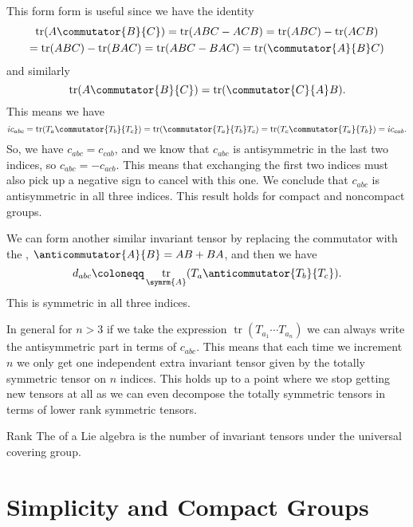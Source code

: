 \documentclass[fleqn]{NotesClass}
\DeclareMathOperator{\tr}{tr}
\begin{document}
    This form form is useful since we have the identity
    \begin{multline}
        \tr(A \commutator{B}{C}) = \tr(ABC - ACB) = \tr(ABC) - \tr(ACB)\\
        = \tr(ABC) - \tr(BAC) = \tr(ABC - BAC) = \tr(\commutator{A}{B}C)
    \end{multline}
    and similarly
    \begin{equation}
        \tr(A\commutator{B}{C}) = \tr(\commutator{C}{A}B).
    \end{equation}
    This means we have
    \begin{equation}
        ic_{abc} = \tr(T_a\commutator{T_b}{T_c}) = \tr(\commutator{T_a}{T_b}T_c) = \tr(T_c\commutator{T_a}{T_b}) = ic_{cab}.
    \end{equation}
    So, we have \(c_{abc} = c_{cab}\), and we know that \(c_{abc}\) is antisymmetric in the last two indices, so \(c_{abc} = -c_{acb}\).
    This means that exchanging the first two indices must also pick up a negative sign to cancel with this one.
    We conclude that \(c_{abc}\) is antisymmetric in all three indices.
    This result holds for compact and noncompact groups.
    
    We can form another similar invariant tensor by replacing the commutator with the , \(\anticommutator{A}{B} = AB + BA\), and then we have
    \begin{equation}
        d_{abc} \coloneqq \tr_{\symrm{A}}(T_a\anticommutator{T_b}{T_c}).
    \end{equation}
    This is symmetric in all three indices.
    
    In general for \(n > 3\) if we take the expression \(\tr(T_{a_1} \dotsm T_{a_n})\) we can always write the antisymmetric part in terms of \(c_{abc}\).
    This means that each time we increment \(n\) we only get one independent extra invariant tensor given by the totally symmetric tensor on \(n\) indices.
    This holds up to a point where we stop getting new tensors at all as we can even decompose the totally symmetric tensors in terms of lower rank symmetric tensors.
    
    \begin{dfn}{Rank}{}
        The  of a Lie algebra is the number of invariant tensors under the universal covering group.
    \end{dfn}
    
    \part{Simplicity and Compact Groups}
\end{document}
